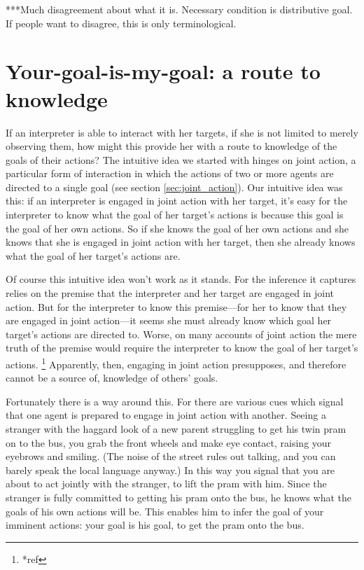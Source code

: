 \documentclass[14pt,a4paper]{extarticle}
\begin{document}
***Much disagreement about what it is.
Necessary condition is distributive goal.
If people want to disagree, this is only terminological.



\section{Your-goal-is-my-goal: a route to knowledge}
If an interpreter is able to interact with her targets,
if she is not limited to merely observing them,
how might this provide her with a route to knowledge of the goals of their actions?
The intuitive idea we started with hinges on joint action, a particular form of interaction in which the actions of two or more agents are directed to a single goal (see section \vref{sec:joint_action}).
Our intuitive idea was this:
if an interpreter is engaged in joint action with her target, 
it's easy for the interpreter to know what the goal of her target's actions is because this goal is the goal of her own actions.
So if she knows the goal of her own actions and she knows that she is engaged in joint action with her target,
then she already knows what the goal of her target's actions are.

Of course this intuitive idea won't work as it stands.  
For the inference it captures relies on the premise that the interpreter and her target are engaged in joint action.
But for the interpreter to know this premise---for her to know that they are engaged in joint action---it seems she must   already know which goal her target's actions are directed to.
Worse,
on many accounts of joint action the mere truth of the premise  would require the interpreter to know the goal of her target's actions.%
\footnote{
*ref}
Apparently, then, engaging in joint action presupposes, and therefore cannot be a source of, knowledge of others' goals. 

Fortunately there is a way around this.  
For there are various cues which signal that one agent is prepared to engage in joint action with another.  
\label{twin_pram}
Seeing a stranger with the haggard look of a new parent struggling to get his twin pram on to the bus, you grab the front wheels and make eye contact, raising your eyebrows and smiling.
(The noise of the street rules out talking, 
and you can barely speak the local language anyway.)   
In this way you signal that you are about to act jointly with the stranger, to lift the pram with him.   
Since the stranger is fully committed to getting his pram onto the bus,
he knows what the goals of his own actions will be.
This enables him to infer the goal of your imminent actions: 
your goal is his goal, to get the pram onto the bus.
\end{document}
